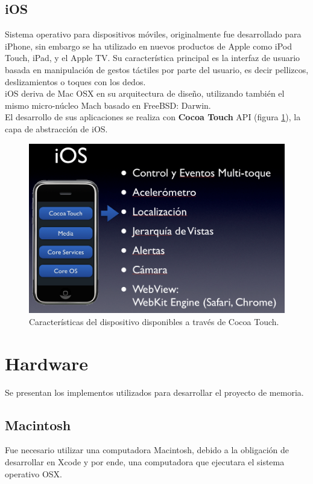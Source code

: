 		\subsection{iOS}
Sistema operativo para dispositivos móviles, originalmente fue desarrollado para iPhone, sin embargo se ha utilizado en nuevos productos de Apple como iPod Touch, iPad, y el Apple TV. Su característica principal es la interfaz de usuario basada en manipulación de gestos táctiles por parte del usuario, es decir pellizcos, deslizamientos o toques con los dedos.\\

iOS deriva de Mac OSX en su arquitectura de diseño, utilizando también el mismo micro-núcleo Mach basado en FreeBSD: Darwin.\\

El desarrollo de sus aplicaciones se realiza con \textbf{Cocoa Touch} API (figura \ref{fig:ios-cocoatouch}), la capa de abstracción de iOS.
\begin{figure}[H]
	\centering
	\includegraphics[scale=0.35]{imgs/ios-cocoatouch.png} 
	\caption{Características del dispositivo disponibles a través de Cocoa Touch.}
	\label{fig:ios-cocoatouch}
\end{figure}  


	\section{Hardware}
		Se presentan los implementos utilizados para desarrollar el proyecto de memoria.
		\subsection{Macintosh}
		Fue necesario utilizar una computadora Macintosh, debido a la obligación de desarrollar en Xcode y por ende, una computadora que ejecutara el sistema operativo OSX.\\
		
